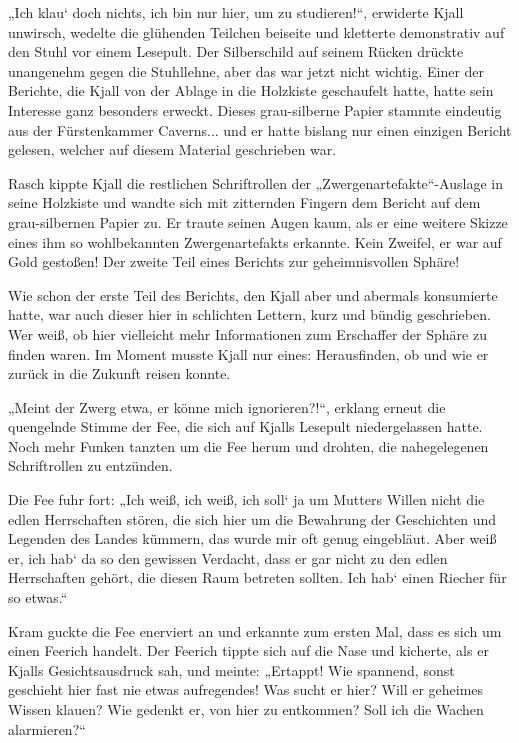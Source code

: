 „Ich klau‘ doch nichts, ich bin nur hier, um zu studieren!“, erwiderte Kjall unwirsch, wedelte die glühenden Teilchen beiseite und kletterte demonstrativ auf den Stuhl vor einem Lesepult. Der Silberschild auf seinem Rücken drückte unangenehm gegen die Stuhllehne, aber das war jetzt nicht wichtig. Einer der Berichte, die Kjall von der Ablage in die Holzkiste geschaufelt hatte, hatte sein Interesse ganz besonders erweckt. Dieses grau-silberne Papier stammte eindeutig aus der Fürstenkammer Caverns... und er hatte bislang nur einen einzigen Bericht gelesen, welcher auf diesem Material geschrieben war.

Rasch kippte Kjall die restlichen Schriftrollen der „Zwergenartefakte“-Auslage in seine Holzkiste und wandte sich mit zitternden Fingern dem Bericht auf dem grau-silbernen Papier zu. Er traute seinen Augen kaum, als er eine weitere Skizze eines ihm so wohlbekannten Zwergenartefakts erkannte. Kein Zweifel, er war auf Gold gestoßen! Der zweite Teil eines Berichts zur geheimnisvollen Sphäre!

Wie schon der erste Teil des Berichts, den Kjall aber und abermals konsumierte hatte, war auch dieser hier in schlichten Lettern, kurz und bündig geschrieben. Wer weiß, ob hier vielleicht mehr Informationen zum Erschaffer der Sphäre zu finden waren. Im Moment musste Kjall nur eines: Herausfinden, ob und wie er zurück in die Zukunft reisen konnte.

„Meint der Zwerg etwa, er könne mich ignorieren?!“, erklang erneut die quengelnde Stimme der Fee, die sich auf Kjalls Lesepult niedergelassen hatte. Noch mehr Funken tanzten um die Fee herum und drohten, die nahegelegenen Schriftrollen zu entzünden.

Die Fee fuhr fort: „Ich weiß, ich weiß, ich soll‘ ja um Mutters Willen nicht die edlen Herrschaften stören, die sich hier um die Bewahrung der Geschichten und Legenden des Landes kümmern, das wurde mir oft genug eingebläut. Aber weiß er, ich hab‘ da so den gewissen Verdacht, dass er gar nicht zu den edlen Herrschaften gehört, die diesen Raum betreten sollten. Ich hab‘ einen Riecher für so etwas.“

Kram guckte die Fee enerviert an und erkannte zum ersten Mal, dass es sich um einen Feerich handelt. Der Feerich tippte sich auf die Nase und kicherte, als er Kjalls Gesichtsausdruck sah, und meinte: „Ertappt! Wie spannend, sonst geschieht hier fast nie etwas aufregendes! Was sucht er hier? Will er geheimes Wissen klauen? Wie gedenkt er, von hier zu entkommen? Soll ich die Wachen alarmieren?“

